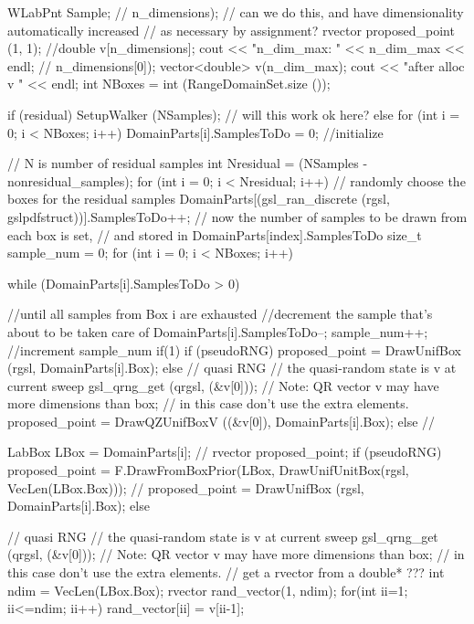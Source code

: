\begin{DoxyCode}
{
  WLabPnt Sample;
                    // n_dimensions); 
  // can we do this, and have dimensionality automatically increased 
  // as necessary by assignment?
  rvector proposed_point (1, 1);
  //double v[n_dimensions];
  cout << "n_dim_max: " << n_dim_max << endl;
                    // n_dimensions[0]);
  vector<double> v(n_dim_max);
  cout << "after alloc v " << endl;
  int NBoxes = int (RangeDomainSet.size ());

  if (residual)
  {
    SetupWalker (NSamples);
  }                 // will this work ok here?
  else
  {
    for (int i = 0; i < NBoxes; i++)
    {
      DomainParts[i].SamplesToDo = 0;
    }
  }                 //initialize

                    // N is number of residual samples
  int Nresidual = (NSamples - nonresidual_samples);
  for (int i = 0; i < Nresidual; i++)
  {                 // randomly choose the boxes for the residual samples
    DomainParts[(gsl_ran_discrete (rgsl, gslpdfstruct))].SamplesToDo++;
  }
  // now the number of samples to be drawn from each box is set, 
  // and stored in DomainParts[index].SamplesToDo
  size_t sample_num = 0;
  for (int i = 0; i < NBoxes; i++)
  {
    while (DomainParts[i].SamplesToDo > 0)
    {               //until all samples from Box i are exhausted
                    //decrement the sample that's about to be taken care of
      DomainParts[i].SamplesToDo--;
      sample_num++; //increment sample_num
      if(1)
      {
        if (pseudoRNG)
        {
          proposed_point = DrawUnifBox (rgsl, DomainParts[i].Box);
        }
        else
        {           // quasi RNG
                    // the quasi-random state is v at current sweep
          gsl_qrng_get (qrgsl, (&v[0]));
          // Note: QR vector v may have more dimensions than box; 
          // in this case don't use the extra elements.
          proposed_point = DrawQZUnifBoxV ((&v[0]), DomainParts[i].Box);
        }
      }
      else          //
      {
        LabBox LBox = DomainParts[i];
        //  rvector proposed_point;
        if (pseudoRNG)
        {
          proposed_point = 
            F.DrawFromBoxPrior(LBox, DrawUnifUnitBox(rgsl, VecLen(LBox.Box)));
          //  proposed_point = DrawUnifBox (rgsl, DomainParts[i].Box);
        }
        else
        {           // quasi RNG
                    // the quasi-random state is v at current sweep
          gsl_qrng_get (qrgsl, (&v[0]));
          // Note: QR vector v may have more dimensions than box; 
          // in this case don't use the extra elements.
          // get a rvector from a double* ???
          int ndim = VecLen(LBox.Box);
          rvector rand_vector(1, ndim);
          for(int ii=1; ii<=ndim; ii++){ rand_vector[ii] = v[ii-1]; }

}}}}}
\end{DoxyCode}
